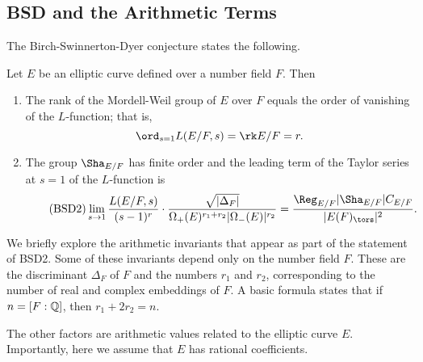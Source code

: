 \subsection{BSD and the Arithmetic Terms}\label{sec-explain-terms}

The Birch-Swinnerton-Dyer conjecture states the following.

\begin{conj}[BSD]
    Let $E$ be an elliptic curve defined over a number field $F$. Then 
    \begin{enumerate}[label={\bfseries  BSD\arabic*.}]
        \item The rank of the Mordell-Weil group of $E$ over $F$ equals the order of vanishing of the $L$-function; that is,
        $$\ord_{s=1}L(E/F,s)=\rk E/F = r.$$
        \item The group $\Sha_{E / F}$ has finite order and the leading term of the Taylor series at $s=1$ of the $L$-function is
        \begin{equation}\label{BSD_2}\tag{BSD2}
            \lim_{s\to1}\frac{L(E/F,s)}{(s-1)^r}\cdot\frac{\sqrt{|\Delta_F|}}{\Omega_+(E)^{r_1+r_2}|\Omega_-(E)|^{r_2}}=\frac{\Reg_{E/F}|\Sha_{E/F}|C_{E/F}}{|E(F)_{\tors}|^2}.
        \end{equation}
    \end{enumerate}
\end{conj}

We briefly explore the arithmetic invariants that appear as part of the statement of BSD2. Some of these invariants depend only on the number field $F$. These are the discriminant $\Delta_F$ of $F$ and the numbers $r_1$ and $r_2$, corresponding to the number of real and complex embeddings of $F$. A basic formula states that if $n=[F:\mathbb{Q}]$, then $r_1+2r_2=n$. 

The other factors are arithmetic values related to the elliptic curve $E$. Importantly, here we assume that $E$ has rational coefficients.

